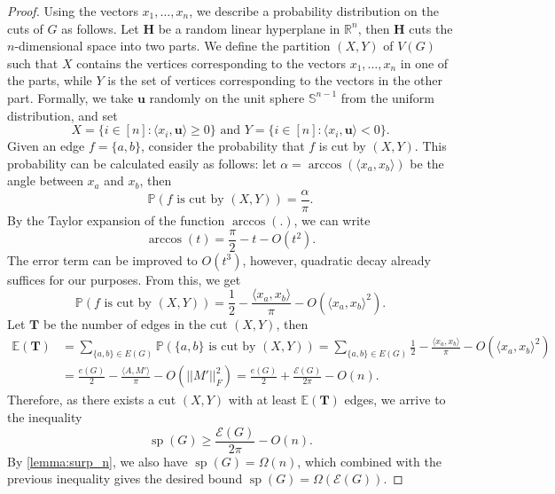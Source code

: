 \documentclass[11pt]{amsart}
\theoremstyle{plain}
\theoremstyle{definition}
\DeclareMathOperator{\surp}{sp}
\begin{document}
\begin{proof}
Using the vectors $x_1,\dots,x_n$, we describe a probability distribution on the cuts of $G$ as follows. Let $\mathbf{H}$ be a random linear hyperplane in $\mathbb{R}^n$, then $\mathbf{H}$ cuts the $n$-dimensional space into two parts. We define the partition $(X,Y)$ of $V(G)$  such that $X$ contains the vertices corresponding to the vectors $x_1,\dots,x_n$ in one of the parts, while $Y$ is the set of vertices corresponding to the vectors in the other part. Formally, we take $\mathbf{u}$ randomly on the unit sphere $\mathbb{S}^{n-1}$ from the uniform distribution, and set $$X=\{i\in [n]: \langle x_i,\mathbf{u}\rangle\geq 0\}\mbox{\ \ \ and\ \ \ }Y=\{i\in [n]:\langle x_i,\mathbf{u}\rangle<0\}.$$ Given an edge $f=\{a,b\}$, consider the probability that $f$ is cut by $(X,Y)$. This probability can be calculated easily as follows: let $\alpha=\arccos(\langle x_a,x_b\rangle)$ be the angle between $x_a$ and $x_b$, then
$$\mathbb{P}(f\mbox{ is cut by }(X,Y))=\frac{\alpha}{\pi}.$$
By the Taylor expansion of the function $\arccos(.)$, we can write $$\arccos(t)=\frac{\pi}{2}-t-O(t^2).$$ The error term can be improved to $O(t^3)$, however, quadratic decay already suffices for our purposes. From this, we get
$$\mathbb{P}(f\mbox{ is cut by }(X,Y))=\frac{1}{2}-\frac{\langle x_a,x_b\rangle}{\pi}-O(\langle x_a,x_b\rangle^2).$$
Let $\mathbf{T}$ be the number of edges in the cut $(X,Y)$, then
\begin{align*}
\mathbb{E}(\mathbf{T})&=\sum_{\{a,b\}\in E(G)} \mathbb{P}(\{a,b\}\mbox{ is cut by }(X,Y))=\sum_{\{a,b\}\in E(G)}\frac{1}{2}-\frac{\langle x_a,x_b\rangle}{\pi}-O\left(\langle x_a,x_b\rangle^2\right)\\
&=\frac{e(G)}{2}-\frac{\langle A,M'\rangle}{\pi}-O(||M'||_F^2)=\frac{e(G)}{2}+\frac{\mathcal{E}(G)}{2\pi}-O(n).
\end{align*}
Therefore, as there exists a cut $(X,Y)$ with at least $\mathbb{E}(\mathbf{T})$ edges, we arrive to the inequality $$\surp(G)\geq \frac{\mathcal{E}(G)}{2\pi}-O(n).$$
By  \cref{lemma:surp_n}, we also have $\surp(G)=\Omega(n)$, which combined with the previous inequality gives the desired bound $\surp(G)=\Omega(\mathcal{E}(G))$.
\end{proof}
\end{document}

